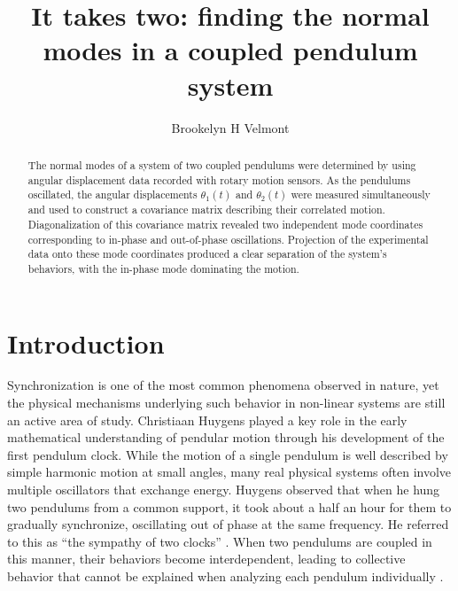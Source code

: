 \documentclass[rc]{physicsinprogress}
\begin{document}
 


\title{It takes two: finding the normal modes in a coupled pendulum system}
\author{Brookelyn H Velmont}
%
\begin{abstract}
 The normal modes of a system of two coupled pendulums were determined by using angular displacement data recorded with rotary motion sensors. As the pendulums oscillated, the angular displacements $\theta_1(t)$ and $\theta_2(t)$ were measured simultaneously and used to construct a covariance matrix describing their correlated motion. Diagonalization of this covariance matrix revealed two independent mode coordinates corresponding to in-phase and out-of-phase oscillations. Projection of the experimental data onto these mode coordinates produced a clear separation of the system's behaviors, with the in-phase mode dominating the motion.
\end{abstract}

\maketitle

\vspace*{\fill}
\section{Introduction}
Synchronization is one of the most common phenomena observed in nature, yet the physical mechanisms underlying such behavior in non-linear systems are still an active area of study. Christiaan Huygens played a key role in the early mathematical understanding of pendular motion through his development of the first pendulum clock. While the motion of a single pendulum is well described by simple harmonic motion at small angles, many real physical systems often involve multiple oscillators that exchange energy. Huygens observed that when he hung two pendulums from a common support, it took about a half an hour for them to gradually synchronize, oscillating out of phase at the same frequency. He referred to this as “the sympathy of two clocks” \cite{Pena_Ramirez_undated-ie}. When two pendulums are coupled in this manner, their behaviors become interdependent, leading to collective behavior that cannot be explained when analyzing each pendulum individually \cite{pena2016sympathy}.
\end{document}
